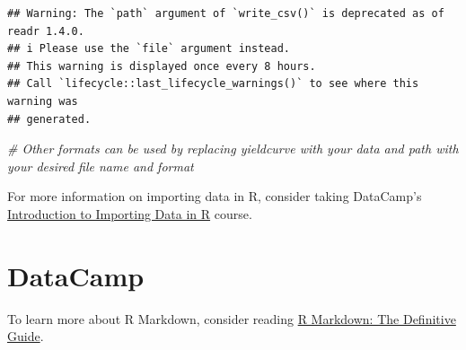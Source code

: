 \documentclass[
]{book}
\newenvironment{Shaded}{\begin{snugshade}}{\end{snugshade}}
\newcommand{\CommentTok}[1]{\textcolor[rgb]{0.56,0.35,0.01}{\textit{#1}}}
\begin{document}
\begin{verbatim}
## Warning: The `path` argument of `write_csv()` is deprecated as of readr 1.4.0.
## i Please use the `file` argument instead.
## This warning is displayed once every 8 hours.
## Call `lifecycle::last_lifecycle_warnings()` to see where this warning was
## generated.
\end{verbatim}

\begin{Shaded}
\begin{Highlighting}[]
\CommentTok{\# Other formats can be used by replacing \textquotesingle{}yieldcurve\textquotesingle{} with your data and \textquotesingle{}path\textquotesingle{} with your desired file name and format}
\end{Highlighting}
\end{Shaded}

For more information on importing data in R, consider taking DataCamp's \href{https://learn.datacamp.com/courses/introduction-to-importing-data-in-r}{Introduction to Importing Data in R} course.

\hypertarget{datacamp}{%
\chapter{DataCamp}\label{datacamp}}

To learn more about R Markdown, consider reading \href{https://bookdown.org/yihui/rmarkdown/}{R Markdown: The Definitive Guide}.
\end{document}
